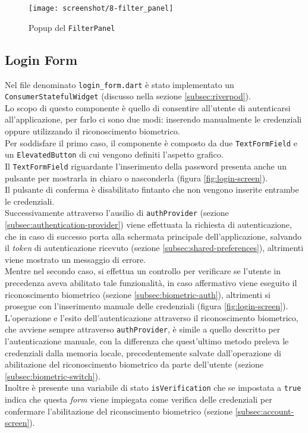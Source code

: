 \begin{figure}[!h] 
    \centering 
    \texttt{[image: screenshot/8-filter\_panel]} 
    \caption{Popup del \lstinline{FilterPanel}}
    \label{fig:filter-panel}
\end{figure}

\subsection{Login Form}
\label{subsec:login-form}

Nel file denominato \lstinline{login_form.dart} è stato implementato un \lstinline{ConsumerStatefulWidget} (discusso nella sezione \ref{subsec:riverpod}).\\
Lo scopo di questo componente è quello di consentire all'utente di autenticarsi all'applicazione, per farlo ci sono due modi: inserendo manualmente le credenziali oppure utilizzando il riconoscimento biometrico.\\
Per soddisfare il primo caso, il componente è composto da due \lstinline{TextFormField}\cite{site:text-form-field} e un \lstinline{ElevatedButton}\cite{site:elevated-button} di cui vengono definiti l'aspetto grafico.\\
Il \lstinline{TextFormField} riguardante l'inserimento della password presenta anche un pulsante per mostrarla in chiaro o nasconderla (figura \ref{fig:login-screen}).\\
Il pulsante di conferma è disabilitato fintanto che non vengono inserite entrambe le credenziali.\\
Successivamente attraverso l'ausilio di \lstinline{authProvider} (sezione \ref{subsec:authentication-provider}) viene effettuata la richiesta di autenticazione, che in caso di successo porta alla schermata principale dell'applicazione, salvando il \emph{token} di autenticazione ricevuto (sezione \ref{subsec:shared-preferences}), altrimenti viene mostrato un messaggio di errore.\\ 
Mentre nel secondo caso, si effettua un controllo per verificare se l'utente in precedenza aveva abilitato tale funzionalità, in caso affermativo viene eseguito il riconoscimento biometrico (sezione \ref{subsec:biometric-auth}), altrimenti si prosegue con l'inserimento manuale delle credenziali (figura \ref{fig:login-screen}).\\
L'operazione e l'esito dell'autenticazione attraverso il riconoscimento biometrico, che avviene sempre attraverso \lstinline{authProvider}, è simile a quello descritto per l'autenticazione manuale, con la differenza che quest'ultimo metodo preleva le credenziali dalla memoria locale, precedentemente salvate dall'operazione di abilitazione del riconoscimento biometrico da parte dell'utente (sezione \ref{subsec:biometric-switch}). \\
Inoltre è presente una variabile di stato \lstinline{isVerification} che se impostata a \lstinline{true} indica che questa \emph{form} viene impiegata come verifica delle credenziali per confermare l'abilitazione del riconscimento biometrico (sezione \ref{subsec:account-screen}).

